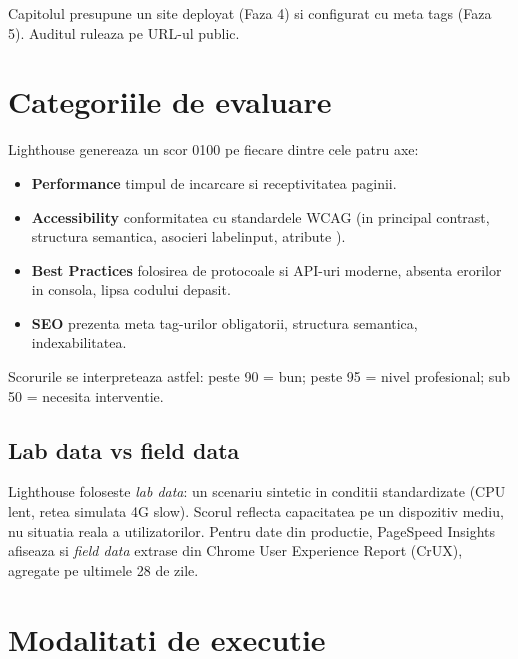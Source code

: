 \begin{nota}
Capitolul presupune un site deployat (Faza 4) si configurat cu meta tags (Faza 5). Auditul ruleaza pe URL-ul public.
\end{nota}

\section{Categoriile de evaluare}

Lighthouse genereaza un scor 0\textendash{}100 pe fiecare dintre cele patru axe:

\begin{itemize}
  \item \textbf{Performance} \textendash{} timpul de incarcare si receptivitatea paginii.
  \item \textbf{Accessibility} \textendash{} conformitatea cu standardele WCAG (in principal contrast, structura semantica, asocieri label\textendash{}input, atribute ).
  \item \textbf{Best Practices} \textendash{} folosirea de protocoale si API-uri moderne, absenta erorilor in consola, lipsa codului depasit.
  \item \textbf{SEO} \textendash{} prezenta meta tag-urilor obligatorii, structura semantica, indexabilitatea.
\end{itemize}

Scorurile se interpreteaza astfel: peste 90 = bun; peste 95 = nivel profesional; sub 50 = necesita interventie.

\subsection{Lab data vs field data}

Lighthouse foloseste \emph{lab data}: un scenariu sintetic in conditii standardizate (CPU lent, retea simulata 4G slow). Scorul reflecta capacitatea pe un dispozitiv mediu, nu situatia reala a utilizatorilor. Pentru date din productie, PageSpeed Insights afiseaza si \emph{field data} extrase din Chrome User Experience Report (CrUX), agregate pe ultimele 28 de zile.

\section{Modalitati de executie}

